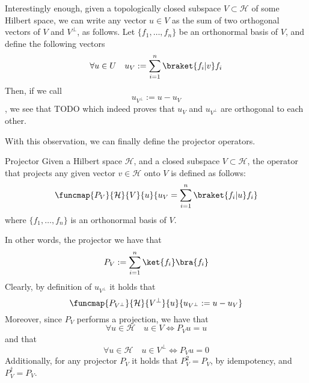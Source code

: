 \documentclass[a4paper, 12pt]{report}
\begin{document}
Interestingly enough, given a topologically closed subspace $V \subset \mathcal H$ of some Hilbert space, we can write any vector $u \in V$ as the sum of two orthogonal vectors of $V$ and $V^\bot$, as follows. Let $\{f_1, \ldots, f_n\}$ be an orthonormal basis of $V$, and define the following vectors $$\forall u \in U \quad u_V := \sum_{i = 1}^n{\braket{f_i|v} f_i}$$ Then, if we call $$u_{V^\bot} := u - u_V$$, we see that
TODO  which indeed proves that $u_V$ and $u_{V^\bot}$ are orthogonal to each other.

With this observation, we can finally define the projector operators.

\begin{frameddefn}{Projector}
    Given a Hilbert space $\mathcal H$, and a closed subspace $V \subset \mathcal H$, the  operator that projects any given vector $v \in \mathcal H$ onto $V$ is defined as follows: $$\funcmap{P_V}{\mathcal H}{V}{u}{u_V = \sum_{i = 1}^n{\braket{f_i|u} f_i}}$$ where $\{f_1, \ldots, f_n\}$ is an orthonormal basis of $V$.
\end{frameddefn}

In other words, the projector we have that $$P_V := \sum_{i = 1}^n{\ket{f_i} \bra{f_i}}$$ Clearly, by definition of $u_{V^\bot}$ it holds that $$\funcmap{P_{V^\bot}}{\mathcal H}{V^\bot}{u}{u_{V^\bot} := u - u_V}$$ Moreover, since $P_V$ performs a projection, we have that $$\forall u \in \mathcal H \quad u \in V \iff P_Vu = u$$ and that $$\forall u \in \mathcal H \quad u \in V^\bot \iff P_V u = 0$$ Additionally, for any projector $P_V$ it holds that $P_V^2 = P_V$, by idempotency, and $P_V^\dag = P_V$.
\end{document}
